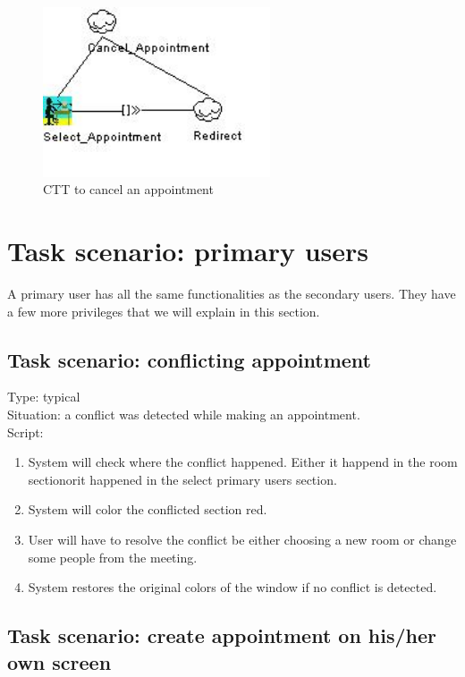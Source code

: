 \documentclass[11pt, a4paper,svglistings]{report}
\begin{document}
\begin{figure}[H]
\centering
    \includegraphics[width=0.6\textwidth]{CancelAppointment.jpg}
  \caption[Cancel appointment CTT]{\label{fig:CancelAppointment}CTT to cancel an appointment}
\end{figure}


\section{Task scenario: primary users}
A primary user has all the same functionalities as the secondary users. They have a few more privileges that we will explain in this section.


\subsection{Task scenario: conflicting appointment}


\label{subsec:conflictPrimary}Type: typical \\
Situation: a conflict was detected while making an appointment. \\
Script:
\begin{enumerate}
\item System will check where the conflict happened. Either it happend in the room sectionorit happened in the select primary users section.
\item System will color the conflicted section red.
\item User will have to resolve the conflict be either choosing a new room or change some people from the meeting.
\item System restores the original colors of the window if no conflict is detected.
\end{enumerate}

\subsection{Task scenario: create appointment on his/her own screen}
\end{document}
